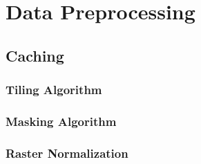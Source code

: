 \section{Data Preprocessing}



\subsection{Caching}

\subsubsection{Tiling Algorithm}


\subsubsection{Masking Algorithm}
\label{sec:masking}


\subsubsection{Raster Normalization}
\label{sec:raster-normalization}

